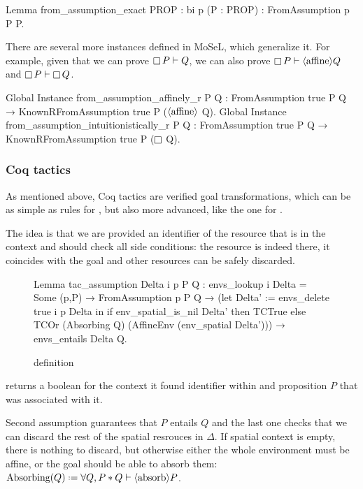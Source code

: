 \begin{coq}
Lemma from_assumption_exact {PROP : bi} p (P : PROP) : FromAssumption p P P.
\end{coq}

There are several more instances defined in MoSeL, which generalize it.
For example, given that we can prove \(\mathop{\Box} P \vdash Q\), we can also prove \(\mathop{\Box} P \vdash \langle\text{affine}\rangle Q\) and  \(\mathop{\Box} P \vdash \mathop{\Box} Q\).
\begin{coq}
Global Instance from_assumption_affinely_r P Q :
  FromAssumption true P Q → KnownRFromAssumption true P ($\langle\text{affine}\rangle$ Q).
Global Instance from_assumption_intuitionistically_r P Q :
  FromAssumption true P Q → KnownRFromAssumption true P ($\mathop{\Box}$ Q).
\end{coq}

\subsubsection{Coq tactics}
\label{sec:coq-tactics}

As mentioned above, Coq tactics are verified goal transformations, which can be as simple as rules for , but also more advanced, like the one for .

The idea is that we are provided an identifier of the resource that is in the context and should check all side conditions: the resource is indeed there, it coincides with the goal and other resources can be safely discarded.

\begin{figure}[H]
\begin{coq}
Lemma tac_assumption Delta i p P Q :
  envs_lookup i Delta = Some (p,P) →
  FromAssumption p P Q →
  (let Delta' := envs_delete true i p Delta in
   if env_spatial_is_nil Delta' then TCTrue
   else TCOr (Absorbing Q) (AffineEnv (env_spatial Delta'))) →
  envs_entails Delta Q.
\end{coq}
\caption{ definition}
\label{fig:tac-assumption}
\end{figure}

 returns a boolean for the context it found identifier  within and proposition \(P\) that was associated with it.

Second assumption guarantees that \(P\) entails \(Q\) and the last one checks that we can discard the rest of the spatial resrouces in \(\Delta\).
If spatial context is empty, there is nothing to discard, but otherwise either the whole environment must be affine, or the goal should be able to absorb them:
\(\Absorbing Q \defeq \forall Q, P * Q \vdash \absorb P\).

